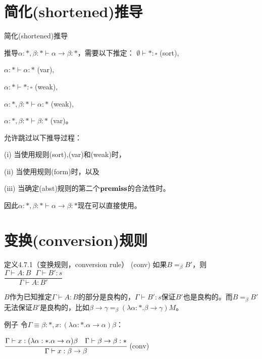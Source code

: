 \documentclass[UTF8,aspectratio=169,mathserif]{beamer}
\begin{document}
	\section{简化(shortened)推导}
		\begin{frame}{简化(shortened)推导}
			\begin{block}{推导$\alpha:*,\beta:*\vdash\alpha\rightarrow\beta:*$，需要以下推定：}
				$\emptyset\vdash*:\square$ (sort),
				
				$\alpha:*\vdash\alpha:*$ (var),
				
				$\alpha:*\vdash*:\square$ (weak),
				
				$\alpha:*,\beta:*\vdash\alpha:*$ (weak),
				
				$\alpha:*,\beta:*\vdash\beta:*$ (var)。
			\end{block}
			
			允许跳过以下推导过程：
			
			(i) 当使用规则(sort),(var)和(weak)时，
			
			(ii) 当使用规则(form)时，以及
			
			(iii) 当确定(abst)规则的第二个$\bf premiss$的合法性时。
			
			因此$\alpha:*,\beta:*\vdash\alpha\rightarrow\beta:*$现在可以直接使用。
		\end{frame}

	\section{变换(conversion)规则}
		\begin{frame}
			\begin{exampleblock}{定义4.7.1（变换规则，conversion rule）}
				(conv) 如果$B=_\beta B'$，则$\dfrac{\Gamma\vdash A:B\ \ \ \Gamma\vdash B':s}{\Gamma\vdash A:B'}$
			\end{exampleblock}
		
			$B$作为已知推定$\Gamma\vdash A:B$的部分是良构的，$\Gamma\vdash B':s$保证$B'$也是良构的。而$B=_\beta B'$无法保证$B'$是良构的，比如$\beta\rightarrow\gamma=_\beta(\lambda\alpha:*.\beta\rightarrow\gamma)M$。
			
			\begin{block}{例子}
				令$\Gamma\equiv\beta:*,x:(\lambda\alpha:*.\alpha\rightarrow\alpha)\beta$：
				
				$\cfrac{\Gamma\vdash x:(\lambda\alpha:*.\alpha\rightarrow\alpha)\beta\ \ \ \Gamma\vdash\beta\rightarrow\beta:*}{\Gamma\vdash x:\beta\rightarrow\beta}$ (conv)
			\end{block}
		\end{frame}
	
\end{document}
